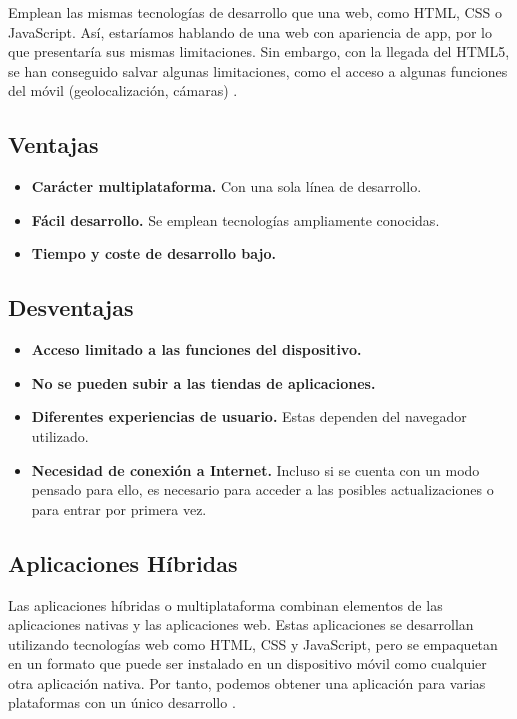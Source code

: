 Emplean las mismas tecnologías de desarrollo que una web, como HTML, CSS o JavaScript. Así, estaríamos hablando de una web con apariencia de app, por lo que presentaría sus mismas limitaciones. Sin embargo, con la llegada del HTML5, se han conseguido salvar algunas limitaciones, como el acceso a algunas funciones del móvil (geolocalización, cámaras) \cite{IM1}.

\subsection*{Ventajas}
\begin{itemize}
	\item \textbf{Carácter multiplataforma.} Con una sola línea de desarrollo.
	\item \textbf{Fácil desarrollo.} Se emplean tecnologías ampliamente conocidas.
	\item \textbf{Tiempo y coste de desarrollo bajo.}
\end{itemize}

\subsection*{Desventajas}
\begin{itemize}
	\item \textbf{Acceso limitado a las funciones del dispositivo.}
	\item \textbf{No se pueden subir a las tiendas de aplicaciones.}
	\item \textbf{Diferentes experiencias de usuario.} Estas dependen del navegador utilizado.
	\item \textbf{Necesidad de conexión a Internet.} Incluso si se cuenta con un modo pensado para ello, es necesario para acceder a las posibles actualizaciones o para entrar por primera vez.
\end{itemize}

\subsection{Aplicaciones Híbridas}

Las aplicaciones híbridas o multiplataforma combinan elementos de las aplicaciones nativas y las aplicaciones web. Estas aplicaciones se desarrollan utilizando tecnologías web como HTML, CSS y JavaScript, pero se empaquetan en un formato que puede ser instalado en un dispositivo móvil como cualquier otra aplicación nativa. Por tanto, podemos obtener una aplicación para varias plataformas con un único desarrollo \cite{IM1}.

